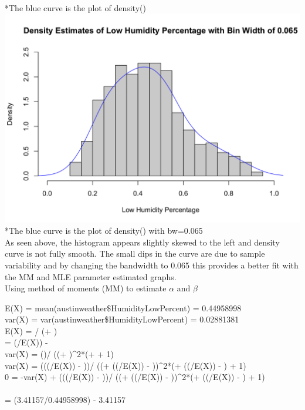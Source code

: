 \documentclass[12pt, letterpaper]{article}
\begin{document}
\footnotesize
\\ \**The blue curve is the plot of density() \\
\includegraphics[scale=0.35]{austinweather_densitybw0.065.png}
\\ \**The blue curve is the plot of density() with bw=0.065 \\
\normalsize
As seen above, the histogram appears slightly skewed to the left and density curve is not fully smooth. The small dips in the curve are due to sample variability and by changing the bandwidth to 0.065 this provides a better fit with the MM and MLE parameter estimated graphs.\\
\newpage
Using method of moments (MM) to estimate ${\alpha}$ and ${\beta}$
\begin{center}
    E(X) = mean(austinweather\$HumidityLowPercent) = 0.44958998\\ 
    var(X) = var(austinweather\$HumidityLowPercent) = 0.02881381\\
    E(X) = {\alpha / (\alpha + \beta)}\\ 
    \beta = (\alpha/E(X)) - \alpha \\
    var(X) = {(\alpha*\beta)/ ((\alpha + \beta)^2*(\alpha + \beta + 1)}\\ 
    var(X) = {(\alpha*((\alpha/E(X)) - \alpha))/ ((\alpha + ((\alpha/E(X)) - \alpha))^2*(\alpha + ((\alpha/E(X)) - \alpha) + 1)}\\ 
    0 = -var(X) + {(\alpha*((\alpha/E(X)) - \alpha))/ ((\alpha + ((\alpha/E(X)) - \alpha))^2*(\alpha + ((\alpha/E(X)) - \alpha) + 1)}\\ 
     \alpha {}\\ 
    \beta = (3.41157/0.44958998) - 3.41157\\ 
     \beta {}\\
\end{center}
\end{document}
